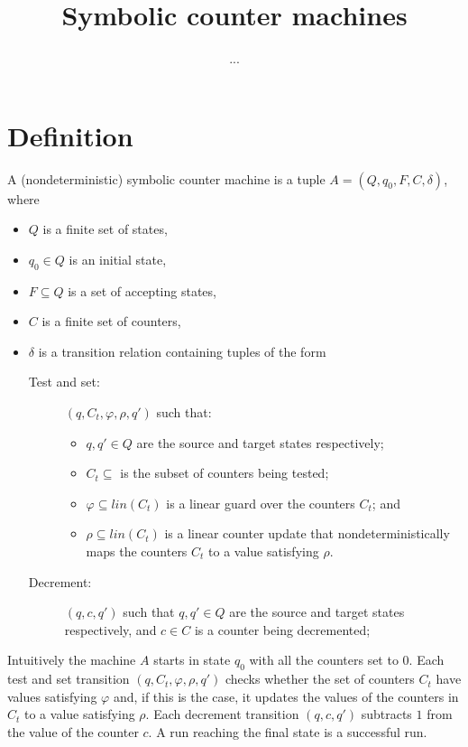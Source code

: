 \documentclass[letterpaper,11pt]{article}
\begin{document}
\title{Symbolic counter machines}

\author{...}
\maketitle

\section{Definition}

\begin{definition}
A (nondeterministic) symbolic counter machine is a tuple $A=(Q,q_0,F,C,\delta)$,
where
\begin{itemize}
\item $Q$ is a finite set of states,
\item $q_0\in Q$ is an initial state,
\item $F\subseteq Q$ is a set of accepting states,
\item $C$ is a finite set of counters,
\item $\delta$ is a transition relation containing tuples of the form
\begin{description}
\item[Test and set:] $(q,C_t,\varphi,\rho,q')$ such that:
\begin{itemize}
\item $q,q'\in Q$ are the source and target states respectively;
\item $C_t\subseteq$ is the subset of counters being tested;
\item $\varphi \subseteq lin(C_t)$ is a linear guard over the counters $C_t$; and
\item $\rho\subseteq lin(C_t)$ is a linear counter update that nondeterministically maps the counters $C_t$ to a value satisfying $\rho$.
\end{itemize}

\item[Decrement:] $(q,c,q')$ such that $q,q'\in Q$ are the source and target states respectively, and $c\in C$ is a counter being decremented;

\end{description}
\end{itemize}
\end{definition}


Intuitively the machine $A$ starts in state $q_0$ with all the counters set to $0$.
Each test and set transition $(q,C_t,\varphi,\rho,q')$ checks whether the set of counters $C_t$ have
values satisfying
$\varphi$ and, if this is the case, it updates the values of the 
counters in $C_t$ to a value satisfying $\rho$.
Each decrement transition $(q,c,q')$ subtracts $1$ from the value of the counter $c$.
A run reaching the final state is a successful run.
\end{document}
